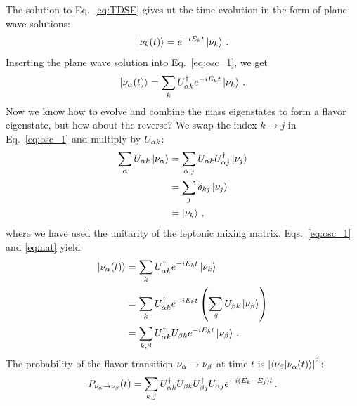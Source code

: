 The solution to Eq.~\ref{eq:TDSE} gives ut the time evolution
in the form of plane wave solutions: 
\begin{align}
    \ket{\nu_k(t)} = e^{-iE_kt}\ket{\nu_k}\,.
\end{align}
Inserting the plane wave solution into Eq.~\ref{eq:osc_1}, we get 
\begin{align}\label{eq:nat}
    \ket{\nu_\alpha(t)} = \sum_k U^\dagger_{\alpha k} e^{-iE_kt}\ket{\nu_k}\,.
\end{align}
Now we know how to evolve and combine the mass eigenstates to form a flavor eigenstate, but how about the reverse?
 We swap the index $k\to j$ in Eq.~\ref{eq:osc_1} and multiply by $U_{\alpha k}$:
\begin{align}\label{eq:osc_k}
    \sum_\alpha U_{\alpha k}\ket{\nu_\alpha} &= \sum_{\alpha, j} U_{\alpha k} U_{\alpha j}^\dagger \ket{\nu_j} \nonumber \\
                              &= \sum_{j} \delta_{kj} \ket{\nu_j} \nonumber \\
                              &= \ket{\nu_k}\,,
\end{align}
where we have used the unitarity of the leptonic mixing matrix. Eqs.~\ref{eq:osc_1} and \ref{eq:nat} yield 
\begin{align}
    \ket{\nu_\alpha(t)} &= \sum_k U^\dagger_{\alpha k} e^{-iE_kt}\ket{\nu_k} \nonumber \\
                 &= \sum_k U^\dagger_{\alpha k} e^{-iE_kt}\left(\sum_\beta U_{\beta k}\ket{\nu_\beta}\right) \nonumber \\
                 &= \sum_{k,\beta} U^\dagger_{\alpha k}U_{\beta k} e^{-iE_kt} \ket{\nu_\beta}\,.
\end{align}
The probability of the flavor transition $\nu_\alpha \to \nu_\beta$ at time $t$ is $\abs{\bra{\nu_\beta}\ket{\nu_\alpha (t)}}^2$:
\begin{align}
    P_{\nu_\alpha \to \nu_\beta}(t) = \sum_{k,j} U^\dagger_{\alpha k}U_{\beta k}U^\dagger_{\beta j}U_{\alpha j} e^{-i(E_k-E_j)t}\,.
\end{align}

